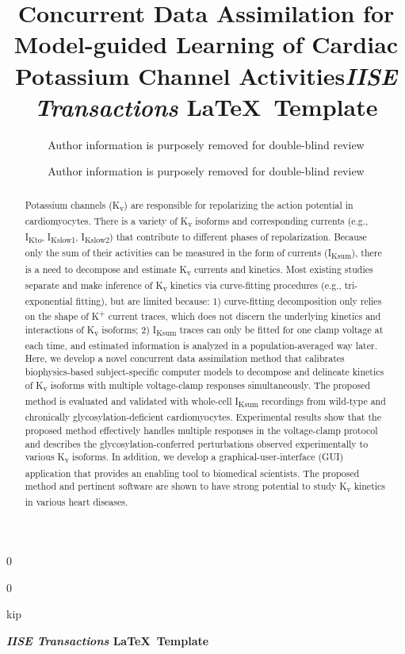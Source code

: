 \documentclass[11pt]{article}
\newcommand{\blind}{0}
\begin{document}
	
	\def\spacingset#1{\renewcommand{\baselinestretch}%
		{#1}\small\normalsize} \spacingset{1}
	
	\blind
	{
		\title{\bf Concurrent Data Assimilation for Model-guided Learning of Cardiac Potassium Channel Activities}
		\author{Author information is purposely removed for double-blind review}
		\date{}
		\maketitle
	} \fi
	
	\blind
	{
        \title{\bf \emph{IISE Transactions} \LaTeX \ Template}
		\author{Author information is purposely removed for double-blind review}
		
\bigskip
		\bigskip
		\bigs   kip
		\begin{center}
			{\LARGE\bf \emph{IISE Transactions} \LaTeX \ Template}
		\end{center}
		\medskip
	} \fi
	\bigskip
	
\begin{abstract}
Potassium channels (K\textsubscript{v}) are responsible for repolarizing the action potential in cardiomyocytes. There is a variety of K\textsubscript{v} isoforms and corresponding currents (e.g., I\textsubscript{Kto}, I\textsubscript{Kslow1}, I\textsubscript{Kslow2}) that contribute to different phases of repolarization. Because only the sum of their activities can be measured in the form of currents (I\textsubscript{Ksum}), there is a need to decompose and estimate K\textsubscript{v} currents and kinetics. Most existing studies separate and make inference of K\textsubscript{v} kinetics via curve-fitting procedures (e.g., tri-exponential fitting), but are limited because: 1) curve-fitting decomposition only relies on the shape of K\textsuperscript{+} current traces, which does not discern the underlying kinetics and interactions of K\textsubscript{v} isoforms; 2) I\textsubscript{Ksum} traces can only be fitted for one clamp voltage at each time, and estimated information is analyzed in a population-averaged way later. Here, we develop a novel concurrent data assimilation method that calibrates biophysics-based subject-specific computer models to decompose and delineate kinetics of K\textsubscript{v} isoforms with multiple voltage-clamp responses simultaneously. The proposed method is evaluated and validated with whole-cell I\textsubscript{Ksum} recordings from wild-type and chronically glycosylation-deficient cardiomyocytes. Experimental results show that the proposed method effectively handles multiple responses in the voltage-clamp protocol and describes the glycosylation-conferred perturbations observed experimentally to various K\textsubscript{v} isoforms. In addition, we develop a graphical-user-interface (GUI) application that provides an enabling tool to biomedical scientists. The proposed method and pertinent software are shown to have strong potential to study K\textsubscript{v} kinetics in various heart diseases.
\end{abstract}
\end{document}
